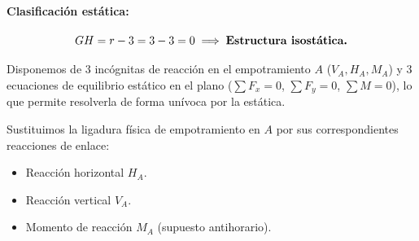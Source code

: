\paragraph{Clasificación estática:}

\begin{equation}

    GH = r - 3 = 3 - 3 = 0 \implies \text{\textbf{Estructura isostática.}}

\end{equation}

Disponemos de 3 incógnitas de reacción en el empotramiento $A$ ($V_A, H_A, M_A$) y 3 ecuaciones de equilibrio estático en el plano ($\sum F_x = 0$, $\sum F_y = 0$, $\sum M = 0$), lo que permite resolverla de forma unívoca por la estática.






Sustituimos la ligadura física de empotramiento en $A$ por sus correspondientes reacciones de enlace:

\begin{itemize}

    \item Reacción horizontal $H_A$.

    \item Reacción vertical $V_A$.

    \item Momento de reacción $M_A$ (supuesto antihorario).

\end{itemize}




